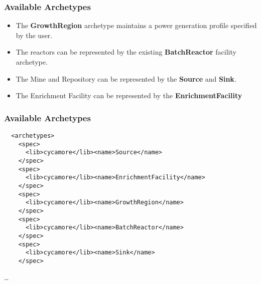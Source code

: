 


\begin{frame}[fragile]
  \frametitle{Available Archetypes}
  \begin{itemize}
\item The \textbf{GrowthRegion} archetype maintains a power generation profile specified by the user. 
\item The reactors can be represented by the existing \textbf{BatchReactor} 
facility archetype.
\item The Mine and Repository can be represented by the \textbf{Source} and 
\textbf{Sink}.
\item The Enrichment Facility can be represented by the \textbf{EnrichmentFacility}
\end{itemize}
\end{frame}

\begin{frame}[fragile]
  \frametitle{Available Archetypes}
\footnotesize{
\begin{lstlisting}
  <archetypes>
    <spec>
      <lib>cycamore</lib><name>Source</name>
    </spec>
    <spec>
      <lib>cycamore</lib><name>EnrichmentFacility</name>
    </spec>
    <spec>
      <lib>cycamore</lib><name>GrowthRegion</name>
    </spec>
    <spec>
      <lib>cycamore</lib><name>BatchReactor</name>
    </spec>
    <spec>
      <lib>cycamore</lib><name>Sink</name>
    </spec>
\end{lstlisting}
\ldots
}
\end{frame}

